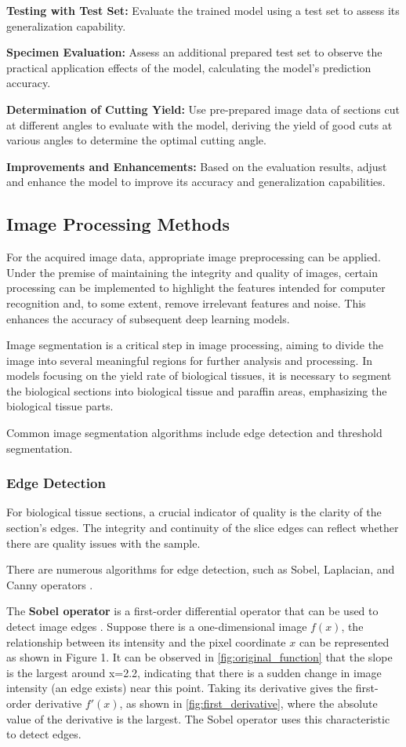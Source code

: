 \textbf{Testing with Test Set:} Evaluate the trained model using a test set to assess its generalization capability.

\textbf{Specimen Evaluation:} Assess an additional prepared test set to observe the practical application effects of the model, calculating the model’s prediction accuracy.

\textbf{Determination of Cutting Yield:} Use pre-prepared image data of sections cut at different angles to evaluate with the model, deriving the yield of good cuts at various angles to determine the optimal cutting angle.

\textbf{Improvements and Enhancements:} Based on the evaluation results, adjust and enhance the model to improve its accuracy and generalization capabilities.

\subsection{Image Processing Methods}

For the acquired image data, appropriate image preprocessing can be applied. Under the premise of maintaining the integrity and quality of images, certain processing can be implemented to highlight the features intended for computer recognition and, to some extent, remove irrelevant features and noise. This enhances the accuracy of subsequent deep learning models.

Image segmentation is a critical step in image processing, aiming to divide the image into several meaningful regions for further analysis and processing. In models focusing on the yield rate of biological tissues, it is necessary to segment the biological sections into biological tissue and paraffin areas, emphasizing the biological tissue parts.

Common image segmentation algorithms include edge detection and threshold segmentation.

\subsubsection{Edge Detection}
For biological tissue sections, a crucial indicator of quality is the clarity of the section's edges. The integrity and continuity of the slice edges can reflect whether there are quality issues with the sample.

There are numerous algorithms for edge detection, such as Sobel, Laplacian, and Canny operators \cite{3.1}.

The \textbf{Sobel operator} is a first-order differential operator that can be used to detect image edges \cite{补充1}. Suppose there is a one-dimensional image $f(x)$, the relationship between its intensity and the pixel coordinate $x$ can be represented as shown in Figure 1. It can be observed in \autoref{fig:original_function} that the slope is the largest around x=2.2, indicating that there is a sudden change in image intensity (an edge exists) near this point. Taking its derivative gives the first-order derivative $f'(x)$, as shown in \autoref{fig:first_derivative}, where the absolute value of the derivative is the largest. The Sobel operator uses this characteristic to detect edges.

